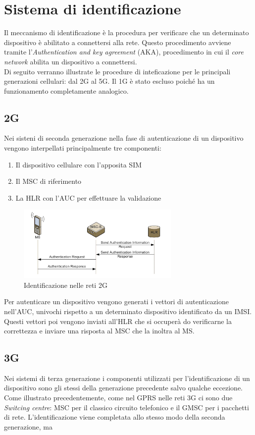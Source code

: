\section{Sistema di identificazione}
Il meccanismo di identificazione è la procedura per verificare che un determinato dispositivo
è abilitato a connettersi alla rete.
Questo procedimento avviene tramite l'\textit{Authentication and key agreement} (AKA), procedimento in cui
il \textit{core network} abilita un dispositivo a connettersi.\\
Di seguito verranno illustrate le procedure di inteficazione per le principali generazioni cellulari: dal 2G al 5G. Il 
1G è stato escluso poiché ha un funzionamento completamente analogico.

\subsection{2G}
Nei sisteni di seconda generazione nella fase di autenticazione di un dispositivo vengono interpellati principalmente tre componenti:
\begin{enumerate}
    \item Il dispositivo cellulare con l'apposita SIM
    \item Il MSC di riferimento
    \item La HLR con l'AUC per effettuare la validazione
\end{enumerate}
\begin{figure}[ht]
    \centering
    \includegraphics[width=0.7\textwidth]{images/identification-2g.png}
    \caption{Identificazione nelle reti 2G}
\end{figure}
Per autenticare un dispositivo vengono generati i vettori di autenticazione nell'AUC, univochi rispetto a un determinato dispositivo identificato da 
un IMSI. Questi vettori poi vengono inviati all'HLR che si occuperà do verificarne la correttezza e inviare una risposta al MSC che la inoltra al MS.

\clearpage

\subsection{3G}
Nei sistemi di terza generazione i componenti utilizzati per l'identificazione di un dispositivo sono gli stessi della generazione precedente salvo qualche 
eccezione. Come illustrato precedentemente, come nel GPRS nelle reti 3G ci sono due \textit{Switcing centre}: MSC per il classico circuito telefonico e il GMSC per 
i pacchetti di rete. L'identificazione viene completata allo stesso modo della seconda generazione, ma 

